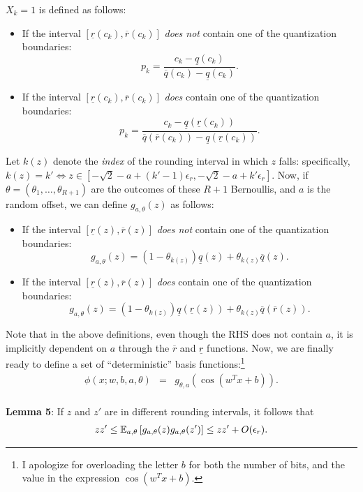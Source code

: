 \documentclass[12pt]{article}
\newcommand{\sq}{\sqrt{2}}
\newcommand{\eps}{\epsilon}
\newcommand{\ulq}{\underline{q}}
\newcommand{\olq}{\overline{q}}
\newcommand{\ulr}{\underline{r}}
\newcommand{\olr}{\overline{r}}
\begin{document}
$X_k=1$ is defined as follows:
\begin{itemize}
	\item If the interval $[\ulr(c_k),\olr(c_k)]$ \textit{does not} contain one of the quantization boundaries:  
	$$p_k = \frac{c_k-\ulq(c_k)}{\olq(c_k)-\ulq(c_k)}.$$
	\item If the interval $[\ulr(c_k),\olr(c_k)]$ \textit{does} contain one of the quantization boundaries:  
	$$p_k = \frac{c_k-\ulq(\ulr(c_k))}{\olq(\olr(c_k))-\ulq(\ulr(c_k))}.$$
\end{itemize}
Let $k(z)$ denote the \textit{index} of the rounding interval in which $z$ falls: specifically, $k(z) = k' \Leftrightarrow z \in [-\sq-a+(k'-1)\eps_r, -\sq-a+k'\eps_r]$.  Now, if  $\theta=(\theta_1,\ldots,\theta_{R+1})$ are the outcomes of these $R+1$ Bernoullis, and $a$ is the random offset, we can define $g_{a,\theta}(z)$ as follows:
\begin{itemize}
	\item If the interval $[\ulr(z),\olr(z)]$ \textit{does not} contain one of the quantization boundaries:
	$$g_{a,\theta}(z) = (1-\theta_{k(z)})\ulq(z) + \theta_{k(z)}\olq(z).$$
	\item If the interval $[\ulr(z),\olr(z)]$ \textit{does} contain one of the quantization boundaries:
	$$g_{a,\theta}(z) = (1-\theta_{k(z)})\ulq(\ulr(z)) + \theta_{k(z)}\olq(\olr(z)).$$
\end{itemize}
Note that in the above definitions, even though the RHS does not contain $a$, it is implicitly dependent on $a$ through the $\olr$ and $\ulr$ functions.
Now, we are finally ready to define a set of ``deterministic'' basis functions:\footnote{I apologize for overloading the letter $b$ for both the number of bits, and the value in the expression $\cos(w^Tx+b)$.}
\begin{eqnarray*}
	\phi(x;w,b,a,\theta) &=&  g_{\theta,a}(\cos(w^Tx + b)). \\
\end{eqnarray*}

\textbf{Lemma 5}: If $z$ and $z'$ are in different rounding intervals, it follows that
\begin{eqnarray*}
zz' \leq \expect{a,\theta}{g_{a,\theta}(z)g_{a,\theta}(z')} \leq zz' + O(\eps_r).
\end{eqnarray*}
\end{document}
